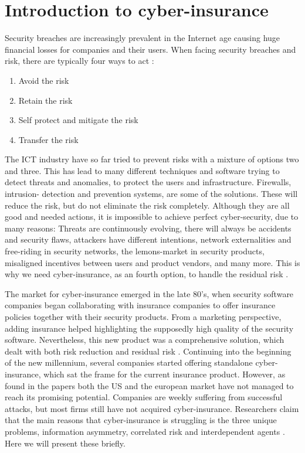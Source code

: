 \section{Introduction to cyber-insurance}
Security breaches are increasingly prevalent in the Internet age causing huge financial losses
for companies and their users. When facing security breaches and risk, there are typically four ways to act \cite{bolot:cyber}:
\begin{enumerate}
\item Avoid the risk
\item Retain the risk
\item Self protect and mitigate the risk
\item Transfer the risk
\end{enumerate}
The ICT industry have so far tried to prevent risks with a mixture of options two and three. This has lead to many different techniques and software trying to detect threats and anomalies, to protect the users and infrastructure. Firewalls, intrusion- detection and prevention systems, are some of the solutions. These will reduce the risk, but do not eliminate the risk completely. Although they are all good and needed actions, it is impossible to achieve perfect cyber-security, due to many reasons: Threats are continuously evolving, there will always be accidents and security flaws, attackers have different intentions, network externalities and free-riding in security networks, the lemons-market in security products, misaligned incentives between users and product vendors, and many more. 
This is why we need cyber-insurance, as an fourth option, to handle the residual risk \cite{bolot:cyber2,ranjan:cyber}.

The market for cyber-insurance emerged in the late 80's, when security software companies began collaborating with insurance companies to offer insurance policies together with their security products. From a marketing perspective, adding insurance helped highlighting the supposedly high quality of the security software. Nevertheless, this new product was a comprehensive solution, which dealt with both risk reduction and residual risk \cite{bolot:new}. Continuing into the beginning of the new millennium, several companies started offering standalone cyber-insurance, which sat the frame for the current insurance product. However, as found in the papers \cite{ccost,evolvingcyber,CFCunder} both the US and the european market have not managed to reach its promising potential. Companies are weekly suffering from successful attacks, but most firms still have not acquired cyber-insurance. 
Researchers claim that the main reasons that cyber-insurance is struggling is the three unique problems, information asymmetry, correlated risk and interdependent agents \cite{bohme2010modeling}. Here we will present these briefly.
